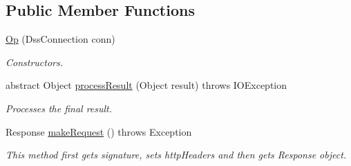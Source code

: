 \subsection*{Public Member Functions}
\begin{DoxyCompactItemize}
\item 
\hyperlink{classorg_1_1jcs_1_1dss_1_1op_1_1Op_a7a14d5b4d7eb1f579e9e6407ebcafe8e}{Op} (Dss\+Connection conn)\hypertarget{classorg_1_1jcs_1_1dss_1_1op_1_1Op_a7a14d5b4d7eb1f579e9e6407ebcafe8e}{}\label{classorg_1_1jcs_1_1dss_1_1op_1_1Op_a7a14d5b4d7eb1f579e9e6407ebcafe8e}

\begin{DoxyCompactList}\small\item\em Constructors. \end{DoxyCompactList}\item 
abstract Object \hyperlink{classorg_1_1jcs_1_1dss_1_1op_1_1Op_a8d268fda2eaa7be47a818427044189aa}{process\+Result} (Object result)  throws I\+O\+Exception\hypertarget{classorg_1_1jcs_1_1dss_1_1op_1_1Op_a8d268fda2eaa7be47a818427044189aa}{}\label{classorg_1_1jcs_1_1dss_1_1op_1_1Op_a8d268fda2eaa7be47a818427044189aa}

\begin{DoxyCompactList}\small\item\em Processes the final result. \end{DoxyCompactList}\item 
Response \hyperlink{classorg_1_1jcs_1_1dss_1_1op_1_1Op_a8502896422a70d8e8f712b57490b1a91}{make\+Request} ()  throws Exception 
\begin{DoxyCompactList}\small\item\em This method first gets signature, sets http\+Headers and then gets Response object. \end{DoxyCompactList}\end{DoxyCompactItemize}
